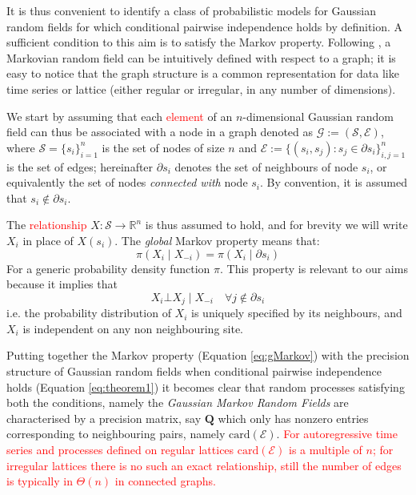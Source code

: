 \documentclass[openany]{book}
\begin{document}
It is thus convenient to identify a class of probabilistic models for Gaussian random fields for which conditional pairwise independence holds by definition. A sufficient condition to this aim is to satisfy the Markov property. Following \citep[][Section 2.2]{GMRFs}, a Markovian random field can be intuitively defined with respect to a graph; it is easy to notice that the graph structure is a common representation for data like time series or lattice (either regular or irregular, in any number of dimensions). 

We start by assuming that each \textcolor{red}{element} of an $n$-dimensional Gaussian random field can thus be associated with a node in a graph denoted as $\mathcal{G} :=(\mathcal{S}, \mathcal {E}) $, where $\mathcal{S} = \lbrace s_i \rbrace_{i=1}^n$ is the set of nodes of size $n$ and $\mathcal{E} := \lbrace (s_i, s_j) : s_j \in \partial s_i  \rbrace_{i,j=1}^n$ is the set of edges;  hereinafter $\partial s_i$ denotes the set of neighbours of node $s_i$, or equivalently the set of nodes \textit{connected with} node $s_i$. By convention, it is assumed that $s_i \notin \partial s_i$.

The \textcolor{red}{relationship} $X:\mathcal{S} \rightarrow \mathbb{R}^n$ is thus assumed to hold, and for brevity we will write $X_i$ in place of $X(s_i)$. The \textit{global} Markov property \citep{HammersleyClifford} means that:
%
\begin{equation}
\pi(X_i \mid X_{-i}) = \pi(X_i \mid \partial s_i)
    \label{eq:gMarkov}
\end{equation}
%
 For a generic probability density function $\pi$. %
 This property is relevant to our aims because it implies that
 $$
 X_i \bot X_j  \mid X_{-i} \quad \forall j \notin \partial s_i
 $$
i.e. the probability distribution of $X_i$ is uniquely specified by its neighbours, and $X_i$ is independent on any non neighbouring site.

Putting together the Markov property (Equation \ref{eq:gMarkov}) with the precision structure of Gaussian random fields when conditional pairwise independence holds (Equation \ref{eq:theorem1}) it becomes clear that random processes satisfying both the conditions, namely the \textit{Gaussian Markov Random Fields} are characterised by a precision matrix, say $\mathbf{Q}$ which only has nonzero entries corresponding to neighbouring pairs, namely $\mathrm{card}(\mathcal{E})$. \textcolor{red}{For autoregressive time series and processes defined on regular lattices $\mathrm{card}(\mathcal{E})$ is a multiple of $n$; for irregular lattices there is no such an exact relationship, still the number of edges is typically in ${\Theta}(n)$ in connected graphs.}
\end{document}
